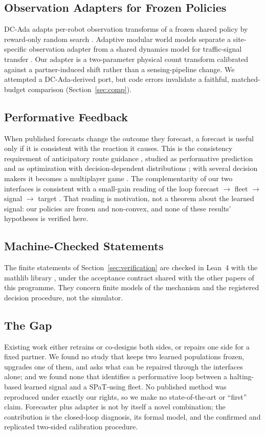 \subsection{Observation Adapters for Frozen Policies}
DC-Ada adapts per-robot observation transforms of a frozen shared policy by reward-only random search \cite{alqithami2026}. Adaptive
modular world models separate a site-specific observation adapter from a shared dynamics model for traffic-signal transfer
\cite{huang2026}. Our adapter is a two-parameter physical count transform calibrated against a partner-induced shift rather than a
sensing-pipeline change. We attempted a DC-Ada-derived port, but code errors invalidate a faithful, matched-budget comparison (Section~\ref{sec:comp}).

\subsection{Performative Feedback}
When published forecasts change the outcome they forecast, a forecast is useful only if it is consistent with the reaction it causes. This
is the consistency requirement of anticipatory route guidance \cite{bottom2000}, studied as performative prediction \cite{perdomo2020} and
as optimization with decision-dependent distributions \cite{drusvyatskiy2023}; with several decision makers it becomes a multiplayer game
\cite{narang2023}. The complementarity of our two interfaces is consistent with a small-gain reading of the loop forecast $\to$ fleet
$\to$ signal $\to$ target \cite{jiang1994,dashkovskiy2007}. That reading is motivation, not a theorem about the learned signal: our
policies are frozen and non-convex, and none of these results' hypotheses is verified here.

\subsection{Machine-Checked Statements}
The finite statements of Section~\ref{sec:verification} are checked in Lean~4 \cite{moura2021} with the mathlib library
\cite{mathlib2020}, under the acceptance contract shared with the other papers of this programme. They concern finite models of the
mechanism and the registered decision procedure, not the simulator.

\subsection{The Gap}
Existing work either retrains or co-designs both sides, or repairs one side for a fixed partner. We found no study that keeps two learned
populations frozen, upgrades one of them, and asks what can be repaired through the interfaces alone; and we found none that identifies a
performative loop between a halting-based learned signal and a SPaT-using fleet. No published method was reproduced under exactly our
rights, so we make no state-of-the-art or ``first'' claim. Forecaster plus adapter is not by itself a novel combination; the contribution
is the closed-loop diagnosis, its formal model, and the confirmed and replicated two-sided calibration procedure.

